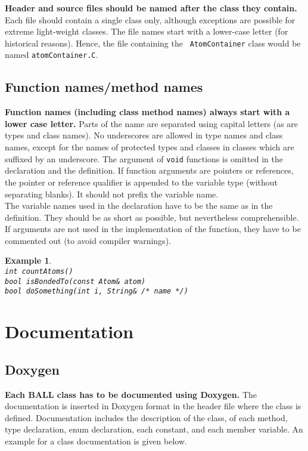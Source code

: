 \documentclass[a4paper,10pt]{article}
\newtheorem{example}{Example}
\begin{document}
{\bf Header and source files should be named after the class they contain.}
Each file should contain a single class only, although exceptions are possible
for extreme light-weight classes. The file names start with a lower-case
letter (for historical reasons). Hence, the file containing the {\tt
AtomContainer} class would be named {\tt atomContainer.C}.

\subsection{Function names/method names}

{\bf Function names (including class method names) always start with a lower case
letter.} Parts of the name are separated using capital letters (as are types
and class names). No underscores are allowed in type names and class names,
except for the names of protected types and classes in classes which are
suffixed by an underscore. The argument of {\tt void} functions is omitted in
the declaration and the definition. If function arguments are pointers or
references, the pointer or reference qualifier is appended to the variable
type (without separating blanks). It should not prefix the variable name.\\
The variable names used in the declaration have to be the same as in the
definition. They should be as short as possible, but nevertheless
comprehensible.  If arguments are not used in the implementation of the
function, they have to be commented out (to avoid compiler warnings).
\begin{example}\hspace*{2mm}\\
{\tt int countAtoms()}\\
{\tt bool isBondedTo(const Atom\& atom)}\\
{\tt bool doSomething(int i, String\& /* name */)}
\end{example}

\section{Documentation}

\subsection{Doxygen}
{\bf Each BALL class has to be documented using Doxygen.} The documentation is
inserted in Doxygen format in the header file where the class is defined.
Documentation includes the description of the class, of each method, type
declaration, enum declaration, each constant, and each member variable.
An example for a class documentation is given below. 
\end{document}
